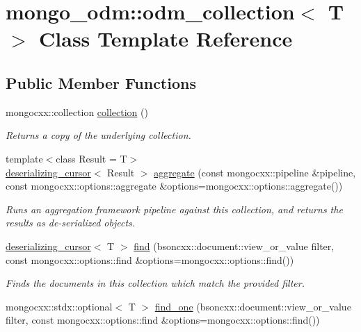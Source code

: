 \hypertarget{classmongo__odm_1_1odm__collection}{}\section{mongo\+\_\+odm\+:\+:odm\+\_\+collection$<$ T $>$ Class Template Reference}
\label{classmongo__odm_1_1odm__collection}
\subsection*{Public Member Functions}
\begin{DoxyCompactItemize}
\item 
mongocxx\+::collection \hyperlink{classmongo__odm_1_1odm__collection_a65bf78cfb9fe5e977d5a9fe49bfcf387}{collection} ()
\begin{DoxyCompactList}\small\item\em Returns a copy of the underlying collection. \end{DoxyCompactList}\item 
{\footnotesize template$<$class Result  = T$>$ }\\\hyperlink{classmongo__odm_1_1deserializing__cursor}{deserializing\+\_\+cursor}$<$ Result $>$ \hyperlink{classmongo__odm_1_1odm__collection_a1be075e3d2b05b4bd328050d3566806c}{aggregate} (const mongocxx\+::pipeline \&pipeline, const mongocxx\+::options\+::aggregate \&options=mongocxx\+::options\+::aggregate())
\begin{DoxyCompactList}\small\item\em Runs an aggregation framework pipeline against this collection, and returns the results as de-\/serialized objects. \end{DoxyCompactList}\item 
\hyperlink{classmongo__odm_1_1deserializing__cursor}{deserializing\+\_\+cursor}$<$ T $>$ \hyperlink{classmongo__odm_1_1odm__collection_aef03132e2d00396555832734c75f43a1}{find} (bsoncxx\+::document\+::view\+\_\+or\+\_\+value filter, const mongocxx\+::options\+::find \&options=mongocxx\+::options\+::find())
\begin{DoxyCompactList}\small\item\em Finds the documents in this collection which match the provided filter. \end{DoxyCompactList}\item 
mongocxx\+::stdx\+::optional$<$ T $>$ \hyperlink{classmongo__odm_1_1odm__collection_a76f81952f53bacb0e4516abe3d680230}{find\+\_\+one} (bsoncxx\+::document\+::view\+\_\+or\+\_\+value filter, const mongocxx\+::options\+::find \&options=mongocxx\+::options\+::find())

\end{DoxyCompactItemize}
